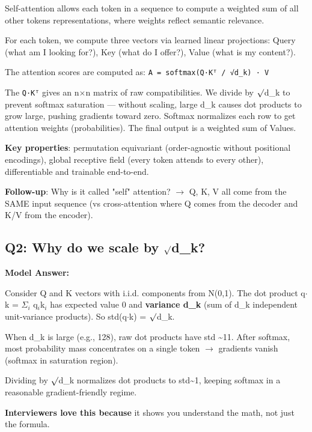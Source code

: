 \documentclass[11pt]{article}
\begin{document}
Self-attention allows each token in a sequence to compute a weighted sum of all other tokens\textquotesingle{} representations, where weights reflect semantic relevance.

For each token, we compute three vectors via learned linear projections: Query (what am I looking for?), Key (what do I offer?), Value (what is my content?).

The attention scores are computed as: \texttt{A\ =\ softmax(Q·Kᵀ\ /\ √d\_k)\ ·\ V}

The \texttt{Q·Kᵀ} gives an n\(\times\)n matrix of raw compatibilities. We divide by \(\surd\)d\_k to prevent softmax saturation --- without scaling, large d\_k causes dot products to grow large, pushing gradients toward zero. Softmax normalizes each row to get attention weights (probabilities). The final output is a weighted sum of Values.

\textbf{Key properties}: permutation equivariant (order-agnostic without positional encodings), global receptive field (every token attends to every other), differentiable and trainable end-to-end.

\textbf{Follow-up}: Why is it called "self" attention? \(\rightarrow\) Q, K, V all come from the SAME input sequence (vs cross-attention where Q comes from the decoder and K/V from the encoder).

\subsection{\texorpdfstring{Q2: Why do we scale by \(\surd\)d\_k?}{Q2: Why do we scale by \textbackslash surdd\_k?}}\label{q2-why-do-we-scale-by-surdd_k}

\textbf{Model Answer:}

Consider Q and K vectors with i.i.d. components from N(0,1). The dot product q\(\cdot\)k = \(\Sigma\)\(_i\) q\(_i\)k\(_i\) has expected value 0 and \textbf{variance d\_k} (sum of d\_k independent unit-variance products). So std(q\(\cdot\)k) = \(\surd\)d\_k.

When d\_k is large (e.g., 128), raw dot products have std \textasciitilde11. After softmax, most probability mass concentrates on a single token \(\rightarrow\) gradients vanish (softmax in saturation region).

Dividing by \(\surd\)d\_k normalizes dot products to std\textasciitilde1, keeping softmax in a reasonable gradient-friendly regime.

\textbf{Interviewers love this because} it shows you understand the math, not just the formula.
\end{document}
